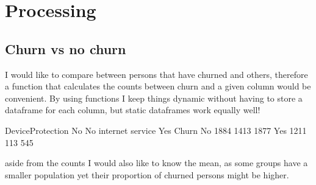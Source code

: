\documentclass[letterpaper,10pt,english]{jupyterBook}
\begin{document}
\section{Processing}
\label{\detokenize{c7_case_studies/Churn:processing}}

\subsection{Churn vs no churn}
\label{\detokenize{c7_case_studies/Churn:churn-vs-no-churn}}
\sphinxAtStartPar
I would like to compare between persons that have churned and others, therefore a function that calculates the counts between churn and a given column would be convenient.
By using functions I keep things dynamic without having to store a dataframe for each column, but static dataframes work equally well!

\begin{sphinxVerbatim}[commandchars=\\\{\}]
 
     \PYG{p}{[} \PYG{p}{]}
\end{sphinxVerbatim}

\begin{sphinxVerbatim}[commandchars=\\\{\}]
\end{sphinxVerbatim}

\begin{sphinxVerbatim}[commandchars=\\\{\}]
DeviceProtection    No  No internet service   Yes
Churn                                            
No                1884                 1413  1877
Yes               1211                  113   545
\end{sphinxVerbatim}

\sphinxAtStartPar
aside from the counts I would also like to know the mean, as some groups have a smaller population yet their proportion of churned persons might be higher.
\end{document}
